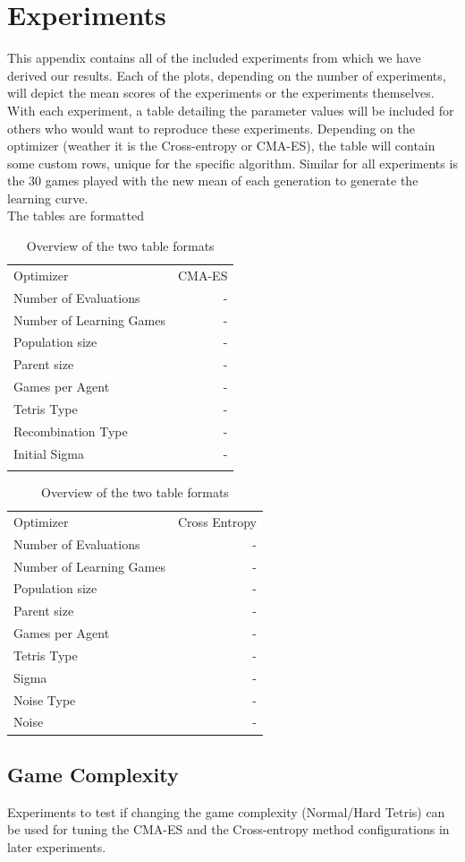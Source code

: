 \section{Experiments}
This appendix contains all of the included experiments from which we have derived our results. Each of the plots, depending on the number of experiments, will depict the mean scores of the experiments or the experiments themselves.
With each experiment, a table detailing the parameter values will be included for others who would want to reproduce these experiments. Depending on the optimizer (weather it is the Cross-entropy or CMA-ES), the table will contain some custom rows, unique for the specific algorithm.
Similar for all experiments is the 30 games played with the new mean of each generation to generate the learning curve.\\
The tables are formatted 
\begin{table}[h]
\centering
\begin{tabular}{l r}
Optimizer & CMA-ES\\
Number of Evaluations & -\\
Number of Learning Games & -\\
Population size& -\\
Parent size & -\\
Games per Agent & -\\
Tetris Type & -\\
\hline
Recombination Type & -\\
Initial Sigma & -\\
 & \\
\end{tabular}
\quad
\begin{tabular}{l r}
Optimizer & Cross Entropy\\
Number of Evaluations & -\\
Number of Learning Games & -\\
Population size & -\\
Parent size & -\\
Games per Agent & -\\
Tetris Type & -\\
\hline
Sigma & -\\
Noise Type & -\\
Noise & -
\end{tabular}
\caption{Overview of the two table formats}
\end{table}

\clearpage

\subsection{Game Complexity \label{AppendixGameComplexity}}
Experiments to test if changing the game complexity (Normal/Hard Tetris) can be used for tuning the CMA-ES and the Cross-entropy method configurations in later experiments.\\


